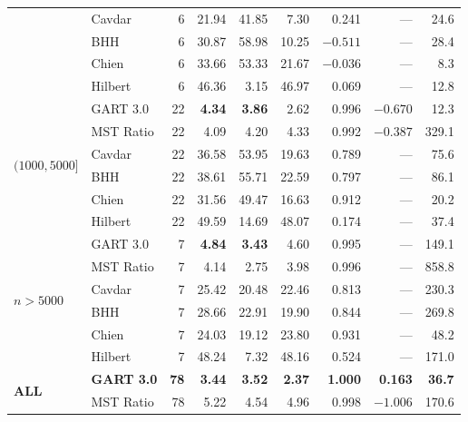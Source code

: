 \begin{table}[!ht]
{\begin{tabular}{@{}ll rrrrrrr@{}}
                                  & Cavdar    & 6 & 21.94 & 41.85 & 7.30 & 0.241 & --- & 24.6 \\
                                  & BHH       & 6 & 30.87 & 58.98 & 10.25 & $-0.511$ & --- & 28.4 \\
                                  & Chien     & 6 & 33.66 & 53.33 & 21.67 & $-0.036$ & --- & 8.3 \\
                                  & Hilbert   & 6 & 46.36 & 3.15 & 46.97 & 0.069 & --- & 12.8 \\ \midrule
\multirow{6}{*}{$(1000, 5000]$}   & GART 3.0  & 22 & \textbf{4.34} & \textbf{3.86} & 2.62 & 0.996 & $-0.670$ & 12.3 \\
                                  & MST Ratio & 22 & 4.09 & 4.20 & 4.33 & 0.992 & $-0.387$ & 329.1 \\
                                  & Cavdar    & 22 & 36.58 & 53.95 & 19.63 & 0.789 & --- & 75.6 \\
                                  & BHH       & 22 & 38.61 & 55.71 & 22.59 & 0.797 & --- & 86.1 \\
                                  & Chien     & 22 & 31.56 & 49.47 & 16.63 & 0.912 & --- & 20.2 \\
                                  & Hilbert   & 22 & 49.59 & 14.69 & 48.07 & 0.174 & --- & 37.4 \\ \midrule
\multirow{6}{*}{$n > 5000$}       & GART 3.0  & 7 & \textbf{4.84} & \textbf{3.43} & 4.60 & 0.995 & --- & 149.1 \\
                                  & MST Ratio & 7 & 4.14 & 2.75 & 3.98 & 0.996 & --- & 858.8 \\
                                  & Cavdar    & 7 & 25.42 & 20.48 & 22.46 & 0.813 & --- & 230.3 \\
                                  & BHH       & 7 & 28.66 & 22.91 & 19.90 & 0.844 & --- & 269.8 \\
                                  & Chien     & 7 & 24.03 & 19.12 & 23.80 & 0.931 & --- & 48.2 \\
                                  & Hilbert   & 7 & 48.24 & 7.32 & 48.16 & 0.524 & --- & 171.0 \\ \midrule
\multirow{6}{*}{\textbf{ALL}}     & \textbf{GART 3.0}  & \textbf{78} & \textbf{3.44} & \textbf{3.52} & \textbf{2.37} & \textbf{1.000} & \textbf{0.163} & \textbf{36.7} \\
                                  & MST Ratio & 78 & 5.22 & 4.54 & 4.96 & 0.998 & $-1.006$ & 170.6 \\

\end{tabular}}
\end{table}
